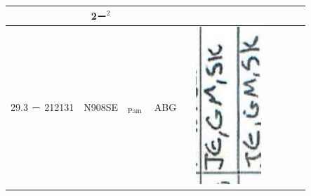\documentclass[10pt]{article}
\begin{document}
\begin{center}
\begin{tabular}{|c|c|c|c|c|c|c|c|c|c|}
 & 2－\({ }^{2}\) &  &  &  \\
\hline
29.3 － 212131 & N908SE & \({ }_{\text {Pam }}\) & ABG &  & \includegraphics[max width=\textwidth]{2025_02_27_dd68c3d38de88f0516d9g-096(2)}

\end{tabular}
\end{center}
\end{document}
